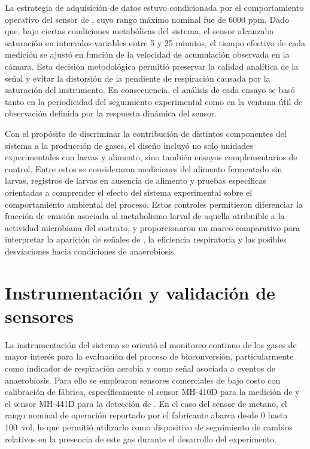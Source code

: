 La estrategia de adquisición de datos estuvo condicionada por el comportamiento operativo del sensor de , cuyo rango máximo nominal fue de 6000 ppm. Dado que, bajo ciertas condiciones metabólicas del sistema, el sensor alcanzaba saturación en intervalos variables entre 5 y 25 minutos, el tiempo efectivo de cada medición se ajustó en función de la velocidad de acumulación observada en la cámara. Esta decisión metodológica permitió preservar la calidad analítica de la señal y evitar la distorsión de la pendiente de respiración causada por la saturación del instrumento. En consecuencia, el análisis de cada ensayo se basó tanto en la periodicidad del seguimiento experimental como en la ventana útil de observación definida por la respuesta dinámica del sensor.

Con el propósito de discriminar la contribución de distintos componentes del sistema a la producción de gases, el diseño incluyó no solo unidades experimentales con larvas y alimento, sino también ensayos complementarios de control. Entre estos se consideraron mediciones del alimento fermentado sin larvas, registros de larvas en ausencia de alimento y pruebas específicas orientadas a comprender el efecto del sistema experimental sobre el comportamiento ambiental del proceso. Estos controles permitieron diferenciar la fracción de emisión asociada al metabolismo larval de aquella atribuible a la actividad microbiana del sustrato, y proporcionaron un marco comparativo para interpretar la aparición de señales de , la eficiencia respiratoria y las posibles desviaciones hacia condiciones de anaerobiosis.

\section{Instrumentación y validación de sensores}

La instrumentación del sistema se orientó al monitoreo continuo de los gases de mayor interés para la evaluación del proceso de bioconversión, particularmente  como indicador de respiración aerobia y  como señal asociada a eventos de anaerobiosis. Para ello se emplearon sensores comerciales de bajo costo con calibración de fábrica, específicamente el sensor MH-410D para la medición de  y el sensor MH-441D para la detección de . En el caso del sensor de metano, el rango nominal de operación reportado por el fabricante abarca desde 0 hasta 100~vol, lo que permitió utilizarlo como dispositivo de seguimiento de cambios relativos en la presencia de este gas durante el desarrollo del experimento.

